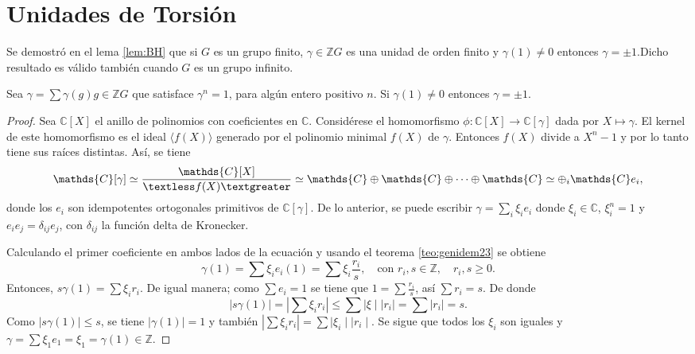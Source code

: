 \section{\quad Unidades de Torsión}
Se demostró en el lema \ref{lem:BH} que si $G$ es un grupo finito, $\gamma \in \mathds{Z}G$ es una unidad de orden finito y $\gamma(1) \neq 0$ entonces $\gamma = \pm 1$.Dicho resultado es válido también cuando $G$ es un grupo infinito. 
\begin{teorema}\label{teo:Passman-Bass}
Sea $\gamma = \sum\gamma(g)g \in \mathds{Z}G$ que satisface $\gamma^n = 1$, para algún entero positivo $n$. Si $\gamma(1) \neq 0$ entonces $\gamma = \pm 1$.
\end{teorema} 
\begin{proof}
Sea $\mathds{C}[X]$ el anillo de polinomios con coeficientes en $\mathds{C}$. Considérese el homomorfismo $\phi \colon \mathds{C}[X] \to \mathds{C}[\gamma]$ dada por $X \mapsto \gamma$. El kernel de este homomorfismo es el ideal $\langle f(X) \rangle$ generado por el polinomio minimal $f(X)$ de $\gamma$. Entonces $f(X)$ divide a $X^n - 1$ y por lo tanto tiene sus raíces distintas. 
Así, se tiene 
\begin{equation*}
\mathds{C}[\gamma] \simeq \frac{\mathds{C}[X]}{\textless f(X) \textgreater} \simeq \mathds{C}\oplus\mathds{C}\oplus\cdots\oplus\mathds{C} \simeq \oplus_i\mathds{C}e_i,
\end{equation*}
donde los $e_i$ son idempotentes ortogonales primitivos de $\mathds{C}[\gamma]$. De lo anterior, se puede escribir $\gamma = \sum_{i}\xi_ie_i$ donde $\xi_i\in \mathds{C}$, $\xi_i^n = 1$ y $e_ie_j = \delta_{ij}e_j$, con $\delta_{ij}$ la función delta de Kronecker. 

Calculando el primer coeficiente en ambos lados de la ecuación y usando el teorema \ref{teo:genidem23} se obtiene
\begin{equation*}
\gamma(1) = \sum\xi_ie_i(1) = \sum\xi_i\frac{r_i}{s}, \quad \mbox{con } r_i, s \in \mathds{Z}, \quad r_i,s \geq 0.
\end{equation*}
Entonces, $s\gamma(1) = \sum\xi_ir_i$. De igual manera; como $\sum e_i = 1$ se tiene que $1 = \sum \frac{r_i}{s}$, así $\sum r_i = s$. De donde
\begin{equation*}
\mid s\gamma(1) \mid = \left| \sum\xi_ir_i  \right| \leq \sum \mid \xi \mid \mid r_i \mid = \sum \mid r_i \mid = s.
\end{equation*}
Como $\mid s\gamma(1) \mid \leq s$, se tiene $\mid \gamma(1) \mid = 1$ y también $\left| \sum \xi_ir_i \right| = \sum \mid \xi_i \mid \mid r_i \mid$. Se sigue que todos los $\xi_i$ son iguales y $\gamma = \sum \xi_1e_1 = \xi_1 = \gamma(1) \in \mathds{Z}$. 
\end{proof}

